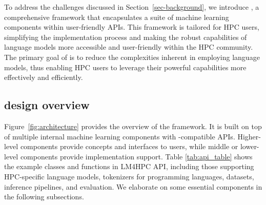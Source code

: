 To address the challenges discussed in Section~\ref{sec-background}, we introduce \ourwork, a comprehensive framework that encapsulates a suite of machine learning components within user-friendly APIs. This framework is tailored for HPC users, simplifying the implementation process and making the robust capabilities of language models more accessible and user-friendly within the HPC community. The primary goal of \ourwork is to reduce the complexities inherent in employing language models, thus enabling HPC users to leverage their powerful capabilities more effectively and efficiently.




\subsection{\ourwork  design overview}

Figure~\ref{fig:architecture} provides the overview of the \ourwork framework. It is built on top of multiple internal machine learning components with \face-compatible APIs. Higher-level components provide concepts and interfaces to users, while middle or lower-level components provide implementation support. 
Table \ref{tab:api_table} shows the example classes and functions in LM4HPC API, including those supporting HPC-specific language models,  tokenizers for programming languages, datasets, inference pipelines, and evaluation.
We elaborate on some essential components in the following subsections. 

